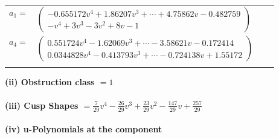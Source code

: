 \documentclass[1p]{elsarticle_modified}
\theoremstyle{definition}
\begin{document}
\begin{tabular}{m{7pt} m{180pt} m{7pt} m{180pt} }
\flushright $a_{1}=$&$\begin{pmatrix}-0.655172 v^{4}+1.86207 v^{3}+\cdots+4.75862 v-0.482759\\- v^4+3 v^3-3 v^2+8 v-1\end{pmatrix}$ \\
\flushright $a_{4}=$&$\begin{pmatrix}0.551724 v^{4}-1.62069 v^{3}+\cdots-3.58621 v-0.172414\\0.0344828 v^{4}-0.413793 v^{3}+\cdots-0.724138 v+1.55172\end{pmatrix}$\\&\end{tabular}
\flushleft \textbf{(ii) Obstruction class $= 1$}\\~\\
\flushleft \textbf{(iii) Cusp Shapes $= \frac{7}{29} v^4-\frac{26}{29} v^3+\frac{23}{29} v^2-\frac{147}{29} v+\frac{257}{29}$}\\~\\
\newpage\renewcommand{\arraystretch}{1}
\flushleft \textbf{(iv) u-Polynomials at the component}\newline \\
\end{document}
